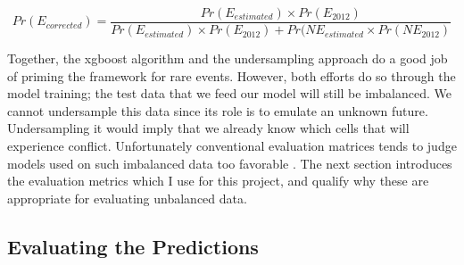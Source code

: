\documentclass[a4paper]{article}
\begin{document}
\[
Pr(E_{corrected}) = \frac{Pr(E_{estimated}) \times Pr(E_{2012})}{Pr(E_{estimated}) \times Pr(E_{2012})+Pr(NE_{estimated} \times Pr(NE_{2012})} \tag{14} \label{eq:bayesC}
\]


Together, the xgboost algorithm and the undersampling approach do a good job of priming the framework for rare events. However, both efforts do so through the model training; the test data that we feed our model will still be imbalanced. We cannot undersample this data since its role is to emulate an unknown future. Undersampling it would imply that we already know which cells that will experience conflict. Unfortunately conventional evaluation matrices tends to judge models used on such imbalanced data too favorable \citep[1264]{He_2008}. The next section introduces the evaluation metrics which I use for this project, and qualify why these are appropriate for evaluating unbalanced data.\par


\subsection{Evaluating the Predictions}
\end{document}
